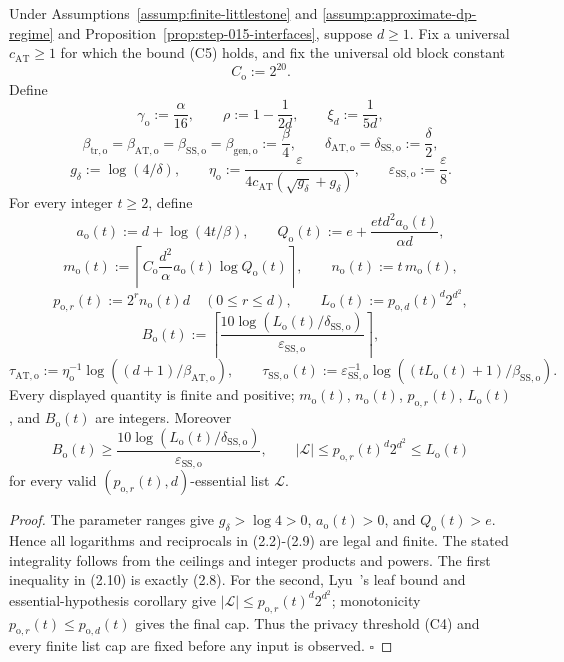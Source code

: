 \begin{lemma}\label{lem:step-015-dictionary}
Under Assumptions~\ref{assump:finite-littlestone} and
\ref{assump:approximate-dp-regime} and
Proposition~\ref{prop:step-015-interfaces}, suppose \(d\ge1\). Fix a universal
\(c_{\mathrm{AT}}\ge1\) for which the bound (C5) holds, and
fix the universal old block constant
\[
C_{\mathrm o}:=2^{20}.
\tag{2.1}
\]
Define
\[
\gamma_{\mathrm o}:=\frac{\alpha}{16},\qquad
\rho:=1-\frac1{2d},\qquad \xi_d:=\frac1{5d},
\tag{2.2}
\]
\[
\beta_{\mathrm{tr,o}}=\beta_{\mathrm{AT,o}}
=\beta_{\mathrm{SS,o}}=\beta_{\mathrm{gen,o}}:=\frac\beta4,
\qquad
\delta_{\mathrm{AT,o}}=\delta_{\mathrm{SS,o}}:=\frac\delta2,
\tag{2.3}
\]
\[
g_\delta:=\log(4/\delta),\qquad
\eta_{\mathrm o}:=
\frac{\varepsilon}
{4c_{\mathrm{AT}}(\sqrt{g_\delta}+g_\delta)},\qquad
\varepsilon_{\mathrm{SS,o}}:=\frac\varepsilon8.
\tag{2.4}
\]
For every integer \(t\ge2\), define
\[
a_{\mathrm o}(t):=d+\log(4t/\beta),\qquad
Q_{\mathrm o}(t):=
e+\frac{etd^2a_{\mathrm o}(t)}{\alpha d},
\tag{2.5}
\]
\[
m_{\mathrm o}(t):=
\left\lceil C_{\mathrm o}\frac{d^2}{\alpha}
a_{\mathrm o}(t)\log Q_{\mathrm o}(t)\right\rceil,\qquad
n_{\mathrm o}(t):=t\,m_{\mathrm o}(t),
\tag{2.6}
\]
\[
p_{\mathrm o,r}(t):=2^rn_{\mathrm o}(t)d
\quad(0\le r\le d),\qquad
L_{\mathrm o}(t):=p_{\mathrm o,d}(t)^d2^{d^2},
\tag{2.7}
\]
\[
B_{\mathrm o}(t):=
\left\lceil
\frac{10\log(L_{\mathrm o}(t)/\delta_{\mathrm{SS,o}})}
{\varepsilon_{\mathrm{SS,o}}}\right\rceil,
\tag{2.8}
\]
\[
\tau_{\mathrm{AT,o}}:=
\eta_{\mathrm o}^{-1}
\log((d+1)/\beta_{\mathrm{AT,o}}),\qquad
\tau_{\mathrm{SS,o}}(t):=
\varepsilon_{\mathrm{SS,o}}^{-1}
\log((tL_{\mathrm o}(t)+1)/\beta_{\mathrm{SS,o}}).
\tag{2.9}
\]
Every displayed quantity is finite and positive; \(m_{\mathrm o}(t)\),
\(n_{\mathrm o}(t)\), \(p_{\mathrm o,r}(t)\), \(L_{\mathrm o}(t)\), and
\(B_{\mathrm o}(t)\) are integers. Moreover
\[
B_{\mathrm o}(t)\ge
\frac{10\log(L_{\mathrm o}(t)/\delta_{\mathrm{SS,o}})}
{\varepsilon_{\mathrm{SS,o}}},
\qquad
|\mathcal L|\le p_{\mathrm o,r}(t)^d2^{d^2}
\le L_{\mathrm o}(t)
\tag{2.10}
\]
for every valid \((p_{\mathrm o,r}(t),d)\)-essential list
\(\mathcal L\).


\end{lemma}

\begin{proof}
The parameter ranges give \(g_\delta>\log4>0\),
\(a_{\mathrm o}(t)>0\), and \(Q_{\mathrm o}(t)>e\). Hence all logarithms
and reciprocals in (2.2)-(2.9) are legal and finite. The stated
integrality follows from the ceilings and integer products and powers.
The first inequality in (2.10) is exactly (2.8). For the second, Lyu~\citep{lyu2025}'s
leaf bound and essential-hypothesis corollary give
\(|\mathcal L|\le p_{\mathrm o,r}(t)^d2^{d^2}\); monotonicity
\(p_{\mathrm o,r}(t)\le p_{\mathrm o,d}(t)\) gives the final cap.
Thus the privacy threshold (C4) and every finite list cap are fixed
before any input is observed. \(\square\)


\end{proof}

